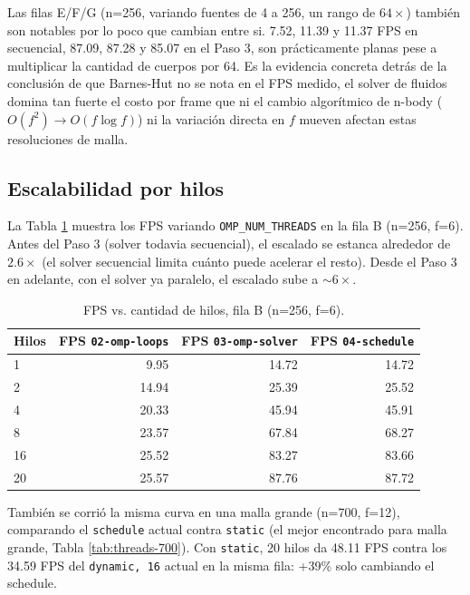 \documentclass[11pt]{article}
\begin{document}
Las filas E/F/G (n=256, variando fuentes de 4 a 256, un rango de $64\times$)
también son notables por lo poco que cambian entre si. 7.52, 11.39 y 11.37 FPS en
secuencial, 87.09, 87.28 y 85.07 en el Paso 3, son prácticamente planas pese a
multiplicar la cantidad de cuerpos por 64. Es la evidencia concreta detrás
de la conclusión de que Barnes-Hut no se nota en el FPS medido, el solver
de fluidos domina tan fuerte el costo por frame que ni el cambio
algorítmico de n-body ($O(f^2) \to O(f\log f)$) ni la variación directa en
$f$ mueven afectan estas resoluciones de malla.

\subsection{Escalabilidad por hilos}

La Tabla \ref{tab:threads} muestra los FPS variando \texttt{OMP\_NUM\_THREADS}
en la fila B (n=256, f=6). Antes del Paso 3 (solver todavia secuencial), el
escalado se estanca alrededor de $2.6\times$ (el solver
secuencial limita cuánto puede acelerar el resto). Desde el Paso 3 en
adelante, con el solver ya paralelo, el escalado sube a $\sim 6\times$.

\begin{table}[ht]
\centering
\begin{tabular}{lrrr}
\toprule
Hilos & FPS \texttt{02-omp-loops} & FPS \texttt{03-omp-solver} & FPS \texttt{04-schedule} \\
\midrule
1  & 9.95  & 14.72 & 14.72 \\
2  & 14.94 & 25.39 & 25.52 \\
4  & 20.33 & 45.94 & 45.91 \\
8  & 23.57 & 67.84 & 68.27 \\
16 & 25.52 & 83.27 & 83.66 \\
20 & 25.57 & 87.76 & 87.72 \\
\bottomrule
\end{tabular}
\caption{FPS vs. cantidad de hilos, fila B (n=256, f=6).}
\label{tab:threads}
\end{table}

También se corrió la misma curva en una malla grande (n=700, f=12),
comparando el \texttt{schedule} actual contra \texttt{static} (el mejor
encontrado para malla grande, Tabla \ref{tab:threads-700}). Con
\texttt{static}, 20 hilos da 48.11 FPS contra los 34.59 FPS del
\texttt{dynamic, 16} actual en la misma fila: +39\% solo cambiando el
schedule.
\end{document}

